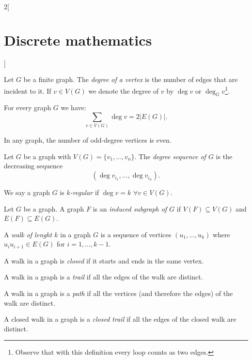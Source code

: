 \documentclass[class=article,10pt,crop=false]{standalone}
\begin{document}
\begin{multicols}{2}[\section{Discrete mathematics}]
\begin{definition}
\end{definition}
\begin{definition}
Let $G$ be a finite graph. The \textit{degree of a vertex} is the number of edges that are incident to it. If $v\in V(G)$ we denote the degree of $v$ by $\deg v$ or $\deg_Gv$\footnote{Observe that with this definition every loop counts as two edges.}.
\end{definition}
\begin{lemma}
For every graph $G$ we have: $$\sum_{v\in V(G)}\deg v=2|E(G)|.$$
\end{lemma}
\begin{corollary}
In any graph, the number of odd-degree vertices is even.
\end{corollary}
\begin{definition}
Let $G$ be a graph with $V(G)=\{v_1,\ldots,v_n\}$. The \textit{degree sequence of $G$} is the decreasing sequence $$(\deg v_{i_1},\ldots,\deg v_{i_n}).$$
\end{definition}
\begin{definition}
We say a graph $G$ is \textit{$k$-regular} if $\deg v=k$ $\forall v\in V(G)$.
\end{definition}
\begin{definition}
Let $G$ be a graph. A graph $F$ is an \textit{induced subgraph of $G$} if $V(F)\subseteq V(G)$ and $E(F)\subseteq E(G)$.
\end{definition}
\begin{definition}
A \textit{walk of lenght $k$} in a graph $G$ is a sequence of vertices $(u_1,\ldots,u_k)$ where $u_iu_{i+1}\in E(G)$ for $i=1,\ldots,k-1$.
\end{definition}
\begin{definition}
A walk in a graph is \textit{closed} if it starts and ends in the same vertex.
\end{definition}
\begin{definition}
A walk in a graph is a \textit{trail} if all the edges of the walk are distinct.
\end{definition}
\begin{definition}
A walk in a graph is a \textit{path} if all the vertices (and therefore the edges) of the walk are distinct.
\end{definition}
\begin{definition}
A closed walk in a graph is a \textit{closed trail} if all the edges of the closed walk are distinct.
\end{definition}
\begin{definition}

\end{definition}
\end{multicols}
\end{document}
